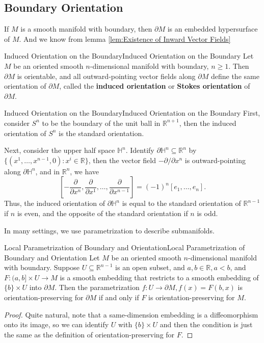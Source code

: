\documentclass[../main.tex]{subfiles}
\begin{document}
\subsection{Boundary Orientation}
If $M$ is a smooth manifold with boundary, then $\partial M$ is an embedded hypersurface of $M$. And we know from lemma \ref{lem:Existence of Inward Vector Fields}

\begin{proposition}{Induced Orientation on the Boundary}{Induced Orientation on the Boundary}
  Let $M$ be an oriented smooth $n$-dimensional manifold with boundary, $n \geq 1$. Then $\partial M$ is orientable, and all outward-pointing vector fields along $\partial M$ define the same orientation of $\partial M$, called the \textbf{induced orientation} or \textbf{Stokes orientation} of $\partial M$.
\end{proposition}

\begin{example}{Induced Orientation on the Boundary}{Induced Orientation on the Boundary}
  First, consider $S^n$ to be the boundary of the unit ball in $\mathbb{R}^{n+1}$, then the induced orientation of $S^n$ is the standard orientation.

  Next, consider the upper half space $\mathbb{H}^n$. Identify $\partial \mathbb{H}^n \subseteq \mathbb{R}^n$ by $\{(x^1, \ldots , x^{n-1}, 0) : x^i \in \mathbb{R}\}$, then the vector field $- \partial / \partial x^n$ is outward-pointing along $\partial \mathbb{H}^n$, and in $\mathbb{R}^n$, we have
  \begin{equation*}
    \left[ -\frac{\partial}{\partial x^n}, \frac{\partial}{\partial x^1}, \ldots , \frac{\partial}{\partial x^{n-1}} \right] = (-1)^n [e_1, \ldots , e_n].
  \end{equation*}
  Thus, the induced orientation of $\partial \mathbb{H}^n$ is equal to the standard orientation of $\mathbb{R}^{n-1}$ if $n$ is even, and the opposite of the standard orientation if $n$ is odd.
\end{example}

In many settings, we use parametrization to describe submanifolds.
\begin{lemma}{Local Parametrization of Boundary and Orientation}{Local Parametrization of Boundary and Orientation}
  Let $M$ be an oriented smooth $n$-dimensional manifold with boundary. Suppose $U \subseteq \mathbb{R}^{n-1}$ is an open subset, and $a,b\in \mathbb{R}, a<b$, and $F: (a,b] \times U \to M$ is a smooth embedding that restricts to a smooth embedding of $\{b\} \times U$ into $\partial M$. Then the parametrization $f: U \rightarrow \partial M, f(x) = F(b,x)$ is orientation-preserving for $\partial M$ if and only if $F$ is orientation-preserving for $M$.
\end{lemma}
\begin{proof}
  Quite natural, note that a same-dimension embedding is a diffeomorphism onto its image, so we can identify $U$ with $\{b\} \times U$ and then the condition is just the same as the definition of orientation-preserving for $F$.
\end{proof}
\end{document}
